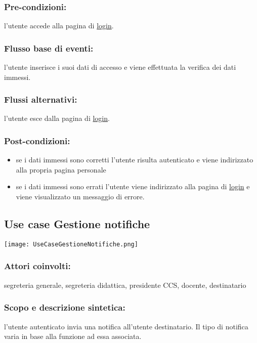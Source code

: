 \documentclass[11pt,a4paper]{article}
\begin{document}
\subsubsection*{Pre-condizioni:}
l'utente accede alla pagina di \underline{login}.
\subsubsection*{Flusso base di eventi:}
l'utente inserisce i suoi dati di accesso e viene effettuata la verifica dei dati immessi.
\subsubsection*{Flussi alternativi:}
l'utente esce dalla pagina di \underline{login}.
\subsubsection*{Post-condizioni:}
\begin{itemize}
 \item se i dati immessi sono corretti l'utente risulta {autenticato} e viene indirizzato alla propria pagina personale
 \item se i dati immessi sono errati l'utente viene indirizzato alla pagina di \underline{login} e viene visualizzato un messaggio di errore. 
\end{itemize}

\subsection{Use case Gestione notifiche}
\begin{center} 
 \texttt{[image: UseCaseGestioneNotifiche.png]} 
\end{center}
\subsubsection*{Attori coinvolti:}
segreteria generale, segreteria didattica, presidente CCS, docente, destinatario
\subsubsection*{Scopo e descrizione sintetica:}
l'utente autenticato invia una notifica all'utente destinatario. Il tipo di notifica varia in base alla funzione ad essa associata.
\subsubsection*{Pre-condizioni:}
l'utente si trova in una delle pagine relative alla gestione dati.
\begin{itemize}
 \item segreteria generale, segreteria didattica, presidente CCS scelgono di invitare nel sistema un utente
\item segreteria generale, segreteria didattica, presidente CCS scelgono di inviare una notifica ad un utente
\item  segreteria generale, segreteria didattica, presidente CCS, docente ricevono un'invito o una notifica
\end{itemize}
\end{document}
